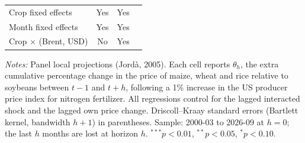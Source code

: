 \begin{table}[htbp]
\begin{threeparttable}
\begin{tabular}{l c c c}
\midrule
Crop fixed effects & Yes & Yes & \\
Month fixed effects & Yes & Yes & \\
Crop $\times$ (Brent, USD) & No & Yes & \\
\bottomrule
\end{tabular}
\begin{tablenotes}[flushleft]
\footnotesize
\item \textit{Notes:} Panel local projections (Jord\`a, 2005). Each cell reports $\theta_h$, the extra cumulative percentage change in the price of maize, wheat and rice relative to soybeans between $t-1$ and $t+h$, following a 1\% increase in the US producer price index for nitrogen fertilizer. All regressions control for the lagged interacted shock and the lagged own price change. Driscoll--Kraay standard errors (Bartlett kernel, bandwidth $h+1$) in parentheses. Sample: 2000-03 to 2026-09 at $h=0$; the last $h$ months are lost at horizon $h$. $^{***}p<0.01$, $^{**}p<0.05$, $^{*}p<0.10$.
\end{tablenotes}
\end{threeparttable}
\end{table}
